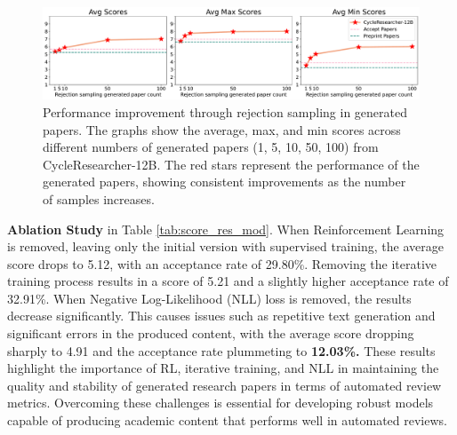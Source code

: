\documentclass{article} %
\begin{document}
\begin{figure}[t]
    \centering
    \includegraphics[width=\textwidth]{reject_charts.pdf}
    \vspace{-0.6cm}
    \caption{Performance improvement through rejection sampling in generated papers. The graphs show the average, max, and min scores across different numbers of generated papers (1, 5, 10, 50, 100) from CycleResearcher-12B. The red stars represent the performance of the generated papers, showing consistent improvements as the number of samples increases.}
    \vspace{-0.3cm}
    \label{fig:reject}
\end{figure}

\textbf{Ablation Study} in Table \ref{tab:score_res_mod}. When Reinforcement Learning is removed, leaving only the initial version with supervised training, the average score drops to 5.12, with an acceptance rate of 29.80\%. Removing the iterative training process results in a score of 5.21 and a slightly higher acceptance rate of 32.91\%. When Negative Log-Likelihood (NLL) loss is removed, the results decrease significantly. This causes issues such as repetitive text generation and significant errors in the produced content, with the average score dropping sharply to 4.91 and the acceptance rate plummeting to \textbf{12.03\%.} These results highlight the importance of RL, iterative training, and NLL in maintaining the quality and stability of generated research papers in terms of automated review metrics. Overcoming these challenges is essential for developing robust models capable of producing academic content that performs well in automated reviews.
\end{document}
